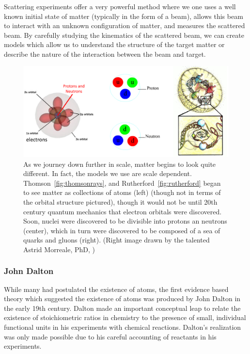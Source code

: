 Scattering experiments offer a very powerful method where we one uses a well
known initial state of matter (typically in the form of a beam), allows this
beam to interact with an unknown configuration of matter, and measures the
scattered beam. By carefully studying the kinematics of the scattered beam, we
can create models which allow us to understand the structure of the target
matter or describe the nature of the interaction between the beam and target. 

\begin{figure}[ht]
	\centering
	\includegraphics[width=\linewidth]{./figures/scale_of_matter.png}
	\caption{
		As we journey down further in scale, matter begins to look quite different.
		In fact, the models we use are scale dependent.
		Thomson~\ref{fig:thomsonrays}, and Rutherford~\ref{fig:rutherford} began to
		see matter as collections of atoms (left)  \cite{Freudenrich2001} (though
		not in terms of the orbital structure pictured), though it would not be
		until 20th century quantum mechanics that electron orbitals were
		discovered.  Soon, nuclei were discovered to be divisible into protons an
		neutrons  \cite{Manisearth2010} (center), which in turn were discovered to
		be composed of a sea of quarks and gluons (right). (Right image drawn by
		the talented Astrid Morreale, PhD,  \cite{Morreale2009})
	}
	\label{fig:scale_of_matter}
\end{figure}

\subsubsection{John Dalton}

While many had postulated the existence of atoms, the first evidence based
theory which suggested the existence of atoms was produced by John Dalton in the
early 19th century. Dalton made an important conceptual leap to relate the
existence of stoichiometric ratios in chemistry to the presence of small,
individual functional units in his experiments with chemical reactions.
Dalton's realization was only made possible due to his careful accounting of
reactants in his experiments.

